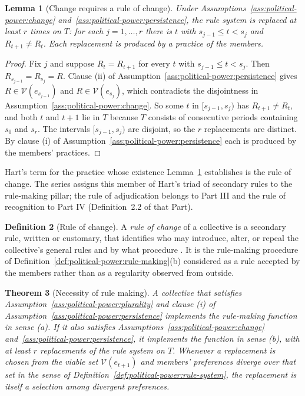 \documentclass[11pt,letterpaper]{article}
\newtheorem{theorem}{Theorem}[section]
\newtheorem{lemma}[theorem]{Lemma}
\theoremstyle{definition}
\newtheorem{definition}[theorem]{Definition}
\theoremstyle{remark}
\begin{document}
\begin{lemma}[Change requires a rule of change]
\label{lem:political-power:change}
Under Assumptions~\ref{ass:political-power:change} and~\ref{ass:political-power:persistence}, the rule system is replaced at least $r$ times on $T$: for each $j=1,\dots,r$ there is $t$ with $s_{j-1}\le t<s_j$ and $R_{t+1}\neq R_t$. Each replacement is produced by a practice of the members.
\end{lemma}

\begin{proof}
Fix $j$ and suppose $R_t=R_{t+1}$ for every $t$ with $s_{j-1}\le t<s_j$. Then $R_{s_{j-1}}=R_{s_j}=R$. Clause (ii) of Assumption~\ref{ass:political-power:persistence} gives $R\in\mathcal{V}(e_{s_{j-1}})$ and $R\in\mathcal{V}(e_{s_j})$, which contradicts the disjointness in Assumption~\ref{ass:political-power:change}. So some $t$ in $[s_{j-1},s_j)$ has $R_{t+1}\neq R_t$, and both $t$ and $t+1$ lie in $T$ because $T$ consists of consecutive periods containing $s_0$ and $s_r$. The intervals $[s_{j-1},s_j)$ are disjoint, so the $r$ replacements are distinct. By clause (i) of Assumption~\ref{ass:political-power:persistence} each is produced by the members' practices.
\end{proof}

Hart's term for the practice whose existence Lemma~\ref{lem:political-power:change} establishes is the rule of change. The series assigns this member of Hart's triad of secondary rules to the rule-making pillar; the rule of adjudication belongs to Part III and the rule of recognition to Part IV (Definition~2.2 of that Part).

\begin{definition}[Rule of change]
\label{def:political-power:rule-of-change}
A \emph{rule of change} of a collective is a secondary rule, written or customary, that identifies who may introduce, alter, or repeal the collective's general rules and by what procedure \citep{hart1961}. It is the rule-making procedure of Definition~\ref{def:political-power:rule-making}(b) considered as a rule accepted by the members rather than as a regularity observed from outside.
\end{definition}

\begin{theorem}[Necessity of rule making]
\label{thm:political-power:necessity}
A collective that satisfies Assumption~\ref{ass:political-power:plurality} and clause (i) of Assumption~\ref{ass:political-power:persistence} implements the rule-making function in sense (a). If it also satisfies Assumptions~\ref{ass:political-power:change} and~\ref{ass:political-power:persistence}, it implements the function in sense (b), with at least $r$ replacements of the rule system on $T$. Whenever a replacement is chosen from the viable set $\mathcal{V}(e_{t+1})$ and members' preferences diverge over that set in the sense of Definition~\ref{def:political-power:rule-system}, the replacement is itself a selection among divergent preferences.
\end{theorem}
\end{document}
